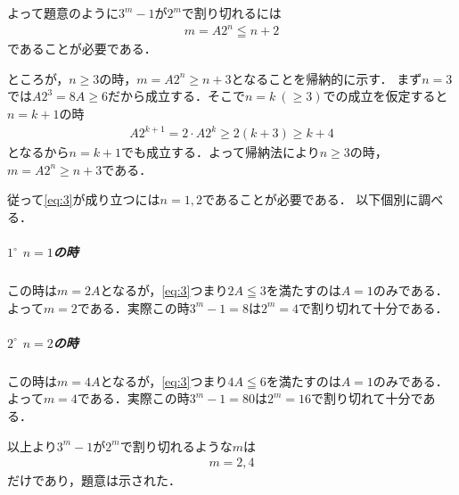 \documentclass[../../main.tex]{subfiles}
\begin{document}
よって題意のように$3^m-1$が$2^m$で割り切れるには
\begin{align}
  m =A2^{n}\leqq n+2 \label{eq:3}
\end{align}
であることが必要である．

ところが，$n\ge 3$の時，$m = A2^{n} \ge n+3$となることを帰納的に示す．
まず$n=3$では$A2^{3}=8A \ge 6$だから成立する．そこで$n=k \ (\ge 3)$での成立を仮定すると
$n=k+1$の時
\begin{align}
  A2^{k+1} = 2\cdot A2^{k} \ge 2(k+3) \ge k+4
\end{align}
となるから$n=k+1$でも成立する．よって帰納法により$n\ge 3$の時，$m = A2^{n} \ge n+3$である．

従って\cref{eq:3}が成り立つには$n=1,2$であることが必要である．
以下個別に調べる．

\subparagraph{$1^{\circ}$ $n=1$の時}

この時は$m=2A$となるが，\cref{eq:3}つまり$2A \leqq 3$を満たすのは$A=1$のみである．
よって$m=2$である．実際この時$3^m-1=8$は$2^m=4$で割り切れて十分である．

\subparagraph{$2^{\circ}$ $n=2$の時}

この時は$m=4A$となるが，\cref{eq:3}つまり$4A \leqq 6$を満たすのは$A=1$のみである．
よって$m=4$である．実際この時$3^m-1=80$は$2^m=16$で割り切れて十分である．
\casesend

以上より$3^m-1$が$2^m$で割り切れるような$m$は
\begin{align}
  m=2,4
\end{align}
だけであり，題意は示された．
\end{document}
